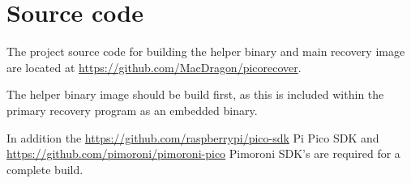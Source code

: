 
\chapter{Source code}\label{appx:second}

The project source code for building the helper binary and main recovery image are located at \href{https://github.com/MacDragon/picorecover}{https://github.com/MacDragon/picorecover}.

The helper binary image should be build first, as this is included within the primary recovery program as an embedded binary.

In addition the \href{https://github.com/raspberrypi/pico-sdk}{https://github.com/raspberrypi/pico-sdk} Pi Pico SDK and \href{https://github.com/pimoroni/pimoroni-pico}{https://github.com/pimoroni/pimoroni-pico} Pimoroni SDK's are required for a complete build.